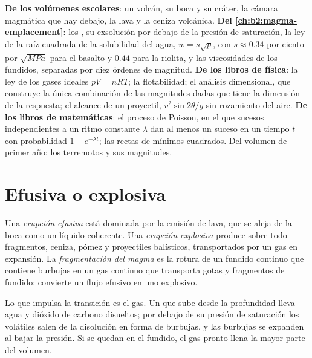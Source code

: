 \begin{recall}
\textbf{De los volúmenes escolares}: un volcán, su boca y su cráter, la cámara
magmática que hay debajo, la lava y la ceniza volcánica. \textbf{Del
\cref{ch:b2:magma-emplacement}}: los , su exsolución por debajo de la
presión de saturación, la ley de la raíz cuadrada de la solubilidad del agua, $w = s\sqrt p$, con
$s \approx 0.34$ por ciento por $\sqrt{\unit{MPa}}$ para el basalto y $0.44$ para la
riolita, y las viscosidades de los fundidos, separadas por diez órdenes de magnitud.
\textbf{De los libros de física}: la ley de los gases ideales $pV = nRT$; la flotabilidad;
el análisis dimensional, que construye la única combinación de las magnitudes dadas
que tiene la dimensión de la respuesta; el alcance de un proyectil, $v^2\sin 2\theta/g$
sin rozamiento del aire. \textbf{De los libros de matemáticas}: el proceso de Poisson,
en el que sucesos independientes a un ritmo constante $\lambda$ dan al menos un suceso
en un tiempo $t$ con probabilidad $1 - e^{-\lambda t}$; las rectas de mínimos cuadrados.
Del volumen de primer año: los terremotos y sus magnitudes.
\end{recall}

\section{Efusiva o explosiva}

\begin{definition}\label{def:b2:eruptive-styles:regimes}
Una \emph{erupción efusiva} está dominada por la
emisión de lava, que se aleja de la boca como un líquido coherente. Una
\emph{erupción explosiva} produce sobre todo fragmentos,
ceniza, pómez y proyectiles balísticos, transportados por un gas en expansión. La \emph{fragmentación
del magma} es la rotura de un fundido continuo
que contiene burbujas en un gas continuo que transporta gotas y fragmentos de fundido;
convierte un flujo efusivo en uno explosivo.
\end{definition}

Lo que impulsa la transición es el gas. Un  que sube desde la profundidad lleva
agua y dióxido de carbono disueltos; por debajo de su presión de saturación los volátiles
salen de la disolución en forma de burbujas, y las burbujas se expanden al bajar la presión.
Si se quedan en el fundido, el gas pronto llena la mayor parte del volumen.

